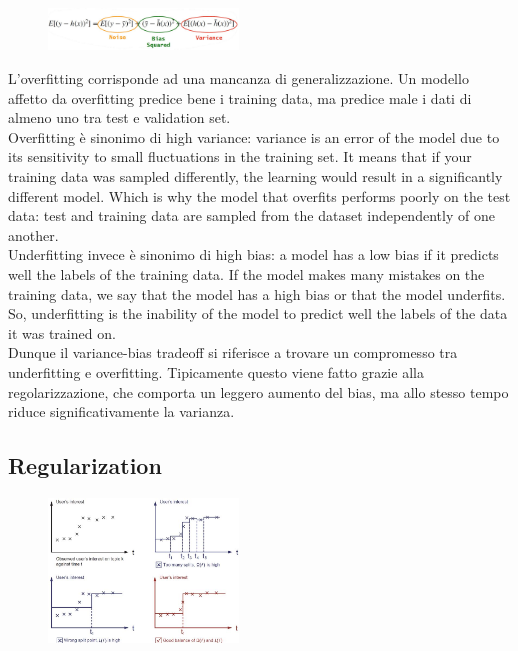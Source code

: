\begin{figure}[ht]
	\centering
	\includegraphics[width=0.45\textwidth]{figure_ml/generalization3.png}
\end{figure}
\FloatBarrier


\begin{tcolorbox}[width=\textwidth,colback={white},title={\textbf{20.} How can you see that ML training is overfitting?  What is the bias vs variance tradeoff?
		
		
	},colbacktitle=red,coltitle=black]
L’overfitting corrisponde ad una mancanza di generalizzazione. Un modello affetto da overfitting predice bene i training data, ma predice male i dati di almeno uno tra test e validation set.\\

Overfitting è sinonimo di high variance: variance is an error of the model due
to its sensitivity to small fluctuations in the training set. It means that if your training data
was sampled differently, the learning would result in a significantly different model. Which
is why the model that overfits performs poorly on the test data: test and training data are
sampled from the dataset independently of one another.\\

Underfitting invece è sinonimo di high bias: a model has a low bias if it predicts well
the labels of the training data. If the model makes many mistakes on the training data, we
say that the model has a high bias or that the model underfits. So, underfitting is the
inability of the model to predict well the labels of the data it was trained on.\\

Dunque il variance-bias tradeoff si riferisce a trovare un compromesso tra underfitting e overfitting. Tipicamente questo viene fatto grazie alla regolarizzazione, che comporta un leggero aumento del bias, ma allo stesso tempo riduce significativamente la varianza.

	
\end{tcolorbox}


\subsection{Regularization}

\begin{figure}
	\includegraphics[width=0.45\textwidth]{figure_ml/regularization.png}
\end{figure} 


